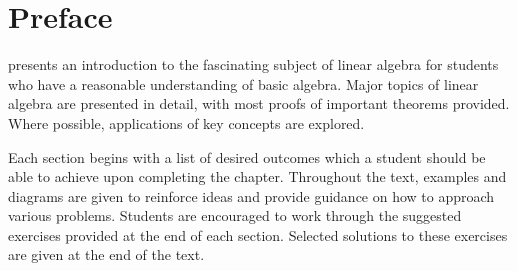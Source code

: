 \chapter*{Preface}

\textit{\bookfulltitle} presents an introduction to the fascinating
subject of linear algebra for students who have a reasonable
understanding of basic algebra. Major topics of linear algebra are
presented in detail, with most proofs of important theorems
provided. Where possible, applications of key concepts are explored.

Each section begins with a list of desired outcomes which a student
should be able to achieve upon completing the chapter.  Throughout the
text, examples and diagrams are given to reinforce ideas and provide
guidance on how to approach various problems. Students are encouraged
to work through the suggested exercises provided at the end of each
section. Selected solutions to these exercises are given at the end of
the text.
